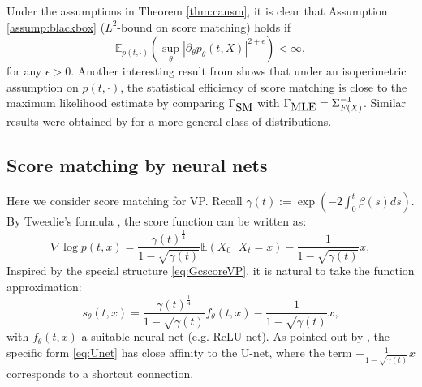 \documentclass[letterpaper,11pt,reqno]{amsart}
\numberwithin{equation}{section}
\begin{document}
\quad Under the assumptions in Theorem \ref{thm:cansm},
it is clear that 
Assumption \ref{assump:blackbox} ($L^2$-bound on score matching) holds
if 
\begin{equation*}
\mathbb{E}_{p(t, \cdot)}\left(\sup_\theta |\partial_\theta p_\theta(t, X)|^{2+\epsilon}\right) < \infty,
\end{equation*}
for any $\epsilon > 0$.
Another interesting result from \cite{Koe22} shows that
under an isoperimetric assumption on $p(t, \cdot)$,
the statistical efficiency of score matching is close to the maximum likelihood estimate
by comparing $\Gamma_{\tiny \mbox{SM}}$ with $\Gamma_{\tiny \mbox{MLE}} = \Sigma_{F(X)}^{-1}$.
Similar results were obtained by \cite{PR23} for a more general class of distributions.

\subsection{Score matching by neural nets}
\label{sc52}

Here we consider score matching for VP.
Recall $\gamma(t):= \exp\left(-2 \int_0^t \beta(s) ds \right)$.
By Tweedie's formula \cite{Efron11, Robbins56},
the score function can be written as:
\begin{equation}
\label{eq:GcscoreVP}
\nabla \log p(t, x)= \frac{\gamma(t)^{\frac{1}{4}}}{1 - \sqrt{\gamma(t)}} \mathbb{E}(X_0 \,|\, X_t = x) - \frac{1}{1 - \sqrt{\gamma(t)}} x,
\end{equation}
Inspired by the special structure \eqref{eq:GcscoreVP},
it is natural to take the function approximation:
\begin{equation}
\label{eq:Unet}
s_\theta(t,x) =\frac{\gamma(t)^{\frac{1}{4}}}{1 - \sqrt{\gamma(t)}} f_\theta(t,x) - \frac{1}{1 - \sqrt{\gamma(t)}} x,
\end{equation}
with $f_\theta(t,x)$ a suitable neural net (e.g. ReLU net).
As pointed out by \cite{CH23},
the specific form \eqref{eq:Unet} has close affinity to the U-net,
where the term $-\frac{1}{1 - \sqrt{\gamma(t)}} x$ corresponds to a shortcut connection.
\end{document}
